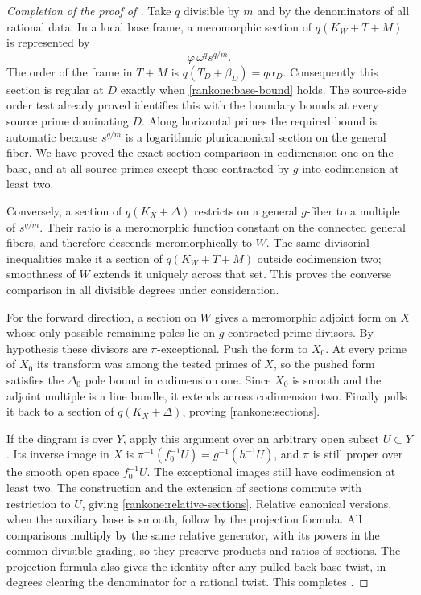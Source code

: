 \begin{proof}[Completion of the proof of ]
Take $q$ divisible by $m$ and by the denominators of all rational
data.  In a local base frame, a meromorphic section of
$q(K_W+T+M)$ is represented
by
\[
 \varphi\,\omega^q s^{q/m}.
\]
The order of the frame in $T+M$ is
$q(T_D+\beta_D)=q\alpha_D$.  Consequently this section is
regular at $D$ exactly when \eqref{rankone:base-bound} holds.
The source-side order test already proved identifies this with
the boundary bounds at every source prime dominating $D$.
Along horizontal primes the required bound is automatic because
$s^{q/m}$ is a logarithmic
pluricanonical section on the general fiber.  We have proved the
exact section comparison in codimension one on the base, and at
all source primes except those contracted by $g$ into codimension
at least two.

Conversely, a section of $q(K_X+\Delta)$ restricts on a general
$g$-fiber to a multiple of $s^{q/m}$.  Their ratio is a
meromorphic function constant on the connected general fibers,
and therefore descends meromorphically to $W$.  The same
divisorial inequalities make it a section of $q(K_W+T+M)$
outside codimension two; smoothness of $W$ extends it uniquely
across that set.  This proves the converse comparison in all
divisible degrees under consideration.

For the forward direction, a section on $W$ gives a meromorphic
adjoint form on $X$ whose only possible remaining poles lie on
$g$-contracted prime divisors.  By hypothesis these divisors are
$\pi$-exceptional.  Push the form to $X_0$.  At every prime of
$X_0$ its transform was among the tested primes of $X$, so the
pushed form satisfies the $\Delta_0$ pole bound in codimension
one.  Since $X_0$ is smooth and the adjoint multiple is a line
bundle, it extends across codimension two.  Finally
 pulls it back to a section of
$q(K_X+\Delta)$, proving \eqref{rankone:sections}.

If the diagram is over $Y$, apply this argument over an arbitrary
open subset $U\subset Y$.  Its inverse image in $X$ is
$\pi^{-1}(f_0^{-1}U)=g^{-1}(h^{-1}U)$, and $\pi$ is still
proper over the smooth open space $f_0^{-1}U$.  The exceptional
images still have codimension at least two.  The construction and
the extension of sections commute with restriction to $U$,
giving \eqref{rankone:relative-sections}.  Relative canonical
versions, when the auxiliary base is smooth, follow by the
projection formula.  All comparisons multiply by the same relative
generator, with its powers in the common divisible grading, so they
preserve products and ratios of sections. The projection formula also
gives the identity after any pulled-back base twist, in degrees clearing
the denominator for a rational twist. This completes
.
\end{proof}

